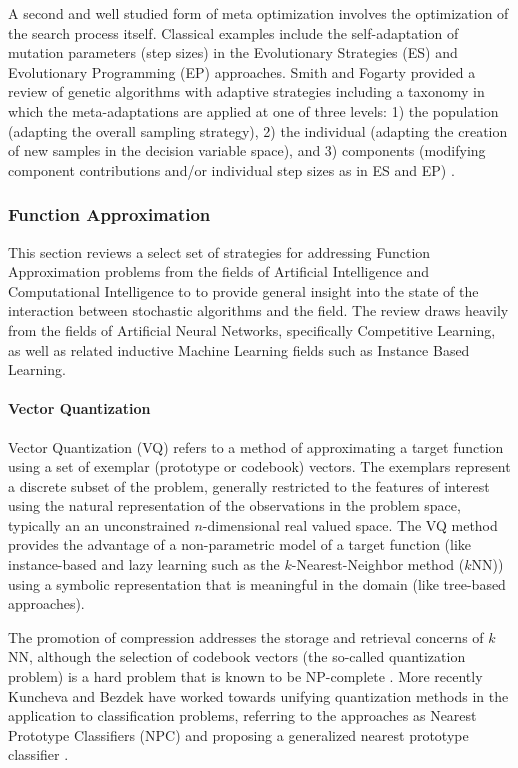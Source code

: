 A second and well studied form of meta optimization involves the optimization of the search process itself. Classical examples include the self-adaptation of mutation parameters (step sizes) in the Evolutionary Strategies (ES) and Evolutionary Programming (EP) approaches. Smith and Fogarty provided a review of genetic algorithms with adaptive strategies including a taxonomy in which the meta-adaptations are applied at one of three levels: 1) the population (adapting the overall sampling strategy), 2) the individual (adapting the creation of new samples in the decision variable space), and 3) components (modifying component contributions and/or individual step sizes as in ES and EP) \cite{Smith1997b}.



%
%
\subsubsection{Function Approximation}
This section reviews a select set of strategies for addressing Function Approximation problems from the fields of Artificial Intelligence and Computational Intelligence to to provide general insight into the state of the interaction between stochastic algorithms and the field. The review draws heavily from the fields of Artificial Neural Networks, specifically Competitive Learning, as well as related inductive Machine Learning fields such as Instance Based Learning.

\paragraph{Vector Quantization}
Vector Quantization (VQ) refers to a method of approximating a target function using a set of exemplar (prototype or codebook) vectors. The exemplars represent a discrete subset of the problem, generally restricted to the features of interest using the natural representation of the observations in the problem space, typically an an unconstrained $n$-dimensional real valued space. The VQ method provides the advantage of a non-parametric model of a target function (like instance-based and lazy learning such as the $k$-Nearest-Neighbor method ($k$NN)) using a symbolic representation that is meaningful in the domain (like tree-based approaches). 

The promotion of compression addresses the storage and retrieval concerns of $k$NN, although the selection of codebook vectors (the so-called quantization problem) is a hard problem that is known to be NP-complete \cite{Garey1982}. More recently Kuncheva and Bezdek have worked towards unifying quantization methods in the application to classification problems, referring to the approaches as Nearest Prototype Classifiers (NPC) and proposing a generalized nearest prototype classifier \cite{Kuncheva1998, Kuncheva1998a}.
	
